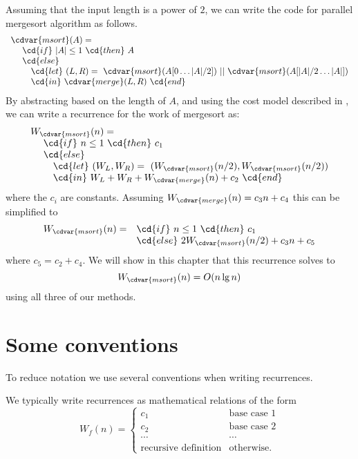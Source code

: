 \begin{example}
\label{ex:analysis::recurrences::mergesort} 
Assuming that the input length is a power of $2$, we can write the code for parallel mergesort algorithm as follows.
\[
\begin{array}{l}
\cdvar{msort}(A) = 
\\
~~~~\cd{if}~|A| \leq 1~\cd{then}~A 
\\
~~~~\cd{else}
\\
~~~~~~~\cd{let}~(L,R) 
  =~\cdvar{msort}(A[0 \dots |A|/2])~||~\cdvar{msort}(A[|A|/2 \dots|A|]) 
\\
~~~~~~~\cd{in}~\cdvar{merge}(L,R)~\cd{end}
\end{array}
\]
By abstracting based on the length of $A$, and using the cost model
described in , we can write a recurrence for the work of mergesort as:
\[
\begin{array}{l}
W_{\cdvar{msort}}(n) = 
\\
~~~~\cd{if}~n \leq 1~\cd{then}~c_1
\\
~~~~\cd{else}
\\
~~~~~~~\cd{let}~(W_L,W_R) 
  =~(W_{\cdvar{msort}}(n/2), W_{\cdvar{msort}}(n/2)) 
\\
~~~~~~~\cd{in}~W_L + W_R + W_{\cdvar{merge}}(n)+ c_2~\cd{end}
\end{array}
\]
where the $c_i$ are constants.    Assuming 
$W_{\cdvar{merge}}(n) = c_3 n + c_4$ this can be simplified to
\[
\begin{array}{ll}
W_{\cdvar{msort}}(n) = &\cd{if}~n \leq 1~\cd{then}~c_1
\\
&\cd{else}~2 W_{\cdvar{msort}}(n/2) + c_3 n + c_5
\end{array}
\]
where $c_5 = c_2 + c_4$.    We will show in this chapter that this
recurrence solves to
\[W_{\cdvar{msort}}(n) = O(n \lg n) \]
using all three of our methods.
\end{example}

\section{Some conventions}
\begin{gram}
To reduce notation we use several conventions when writing recurrences.
\end{gram}

\begin{gram}[Syntax]
We typically write recurrences as mathematical relations of the form
\[
W_f(n) = \left\{
\begin{array}{lll}
c_1 & \mbox{base case 1} 
\\
c_2 & \mbox{base case 2} 
\\
\cdots& \cdots
\\
\mbox{recursive definition}  &  \mbox{otherwise}.
\end{array}
\right. 
\]
%
\end{gram}
%

